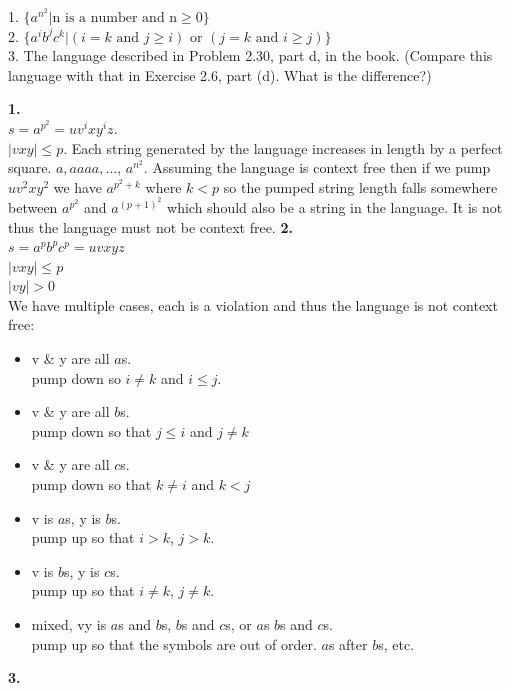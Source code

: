 \begin{problem}{8}
  1. $\{ a^{n^2} | \text{n is a number and n} \ge 0 \}$ \\
  2. $\{ a^ib^jc^k | (i=k \text{ and } j \ge i) \text{ or } (j=k \text{ and } i \ge j) \}$ \\
  3. The language described in Problem 2.30, part d, in the book. (Compare this language with that in Exercise 2.6,
     part (d). What is the difference?)
  \begin{solution}
    \textbf{1.}\\
    $s = a^{p^2} = uv^ixy^iz$. \\
    $|vxy| \le p$.
    \br
    Each string generated by the language increases in length by a perfect square. $a, aaaa,\ldots$, $a^{n^2}$. Assuming
    the language is context free then if we pump $uv^2xy^2$ we have $a^{p^2 + k}$ where $k < p$ so the pumped string
    length falls somewhere between $a^{p^2}$ and $a^{(p + 1)^2}$ which should also be a string in the language. It is
    not thus the language must not be context free.
    \br
    \textbf{2.}\\
    $s = a^pb^pc^p = uvxyz $ \\
    $|vxy| \le p$ \\
    $|vy| > 0$ \\
    We have multiple cases, each is a violation and thus the language is not context free:
    \begin{itemize}
      \item v \& y are all $a$s. \\
        pump down so $i \ne k$ and $i \le j$.
      \item v \& y are all $b$s. \\
        pump down so that $j \le i$ and $j \ne k$
      \item v \& y are all $c$s. \\
        pump down so that $k \ne i$ and $k < j$
      \item v is $a$s, y is $b$s. \\
        pump up so that $i > k$, $j > k$.
      \item v is $b$s, y is $c$s. \\
        pump up so that $i \ne k$, $j \ne k$.
      \item mixed, vy is $a$s and $b$s, $b$s and $c$s, or $a$s $b$s and $c$s. \\
        pump up so that the symbols are out of order. $a$s after $b$s, etc.
    \end{itemize}
    \textbf{3.} \\

\end{solution}
\end{problem}
